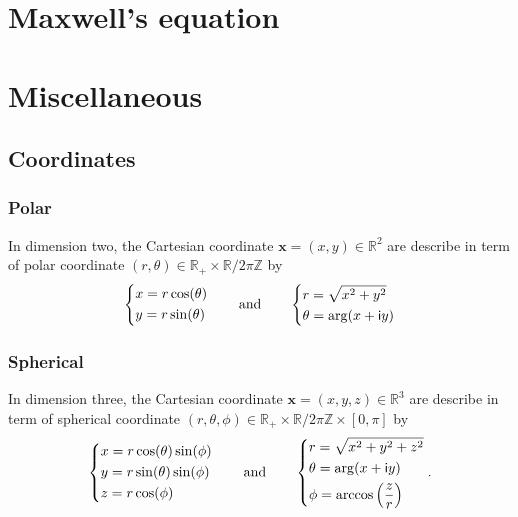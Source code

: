 \documentclass[12pt,a4paper]{article}
\theoremstyle{definition}
\theoremstyle{plain}
\theoremstyle{remark}
\newcommand{\bbR}{\mathbb{R}}
\newcommand{\bbZ}{\mathbb{Z}}
\newcommand{\im}{\mathsf{i}}
\newcommand{\plr}[1]{\left(#1\right)}
\newcommand{\vx}{\boldsymbol{x}}
\begin{document}
\section{Maxwell's equation}

\appendix

\section{Miscellaneous}

\subsection{Coordinates}

%
\subsubsection{Polar}
%

In dimension two, the Cartesian coordinate $\vx = (x, y) \in \bbR^2$ are describe in term of polar coordinate $(r, \theta) \in \bbR_+ \times \bbR / 2\pi\bbZ$ by
\[
    \begin{dcases}
        x = r \cos(\theta) \\
        y = r \sin(\theta)
    \end{dcases} \qquad
    \text{and} \qquad
    \begin{dcases}
        r = \sqrt{x^2 + y^2} \\
        \theta = \arg(x + \im y)
    \end{dcases}
\]

%
\subsubsection{Spherical}
%

In dimension three, the Cartesian coordinate $\vx = (x, y, z) \in \bbR^3$ are describe in term of spherical coordinate $(r, \theta, \phi) \in \bbR_+ \times \bbR / 2\pi\bbZ \times [0, \pi]$ by
\[
    \begin{dcases}
        x = r \cos(\theta) \sin(\phi) \\
        y = r \sin(\theta) \sin(\phi) \\
        z = r \cos(\phi)
    \end{dcases} \qquad
    \text{and} \qquad
    \begin{dcases}
        r = \sqrt{x^2 + y^2 + z^2} \\
        \theta = \arg(x + \im y)   \\
        \phi = \arccos\plr{\frac{z}{r}}
    \end{dcases}.
\]
\end{document}
